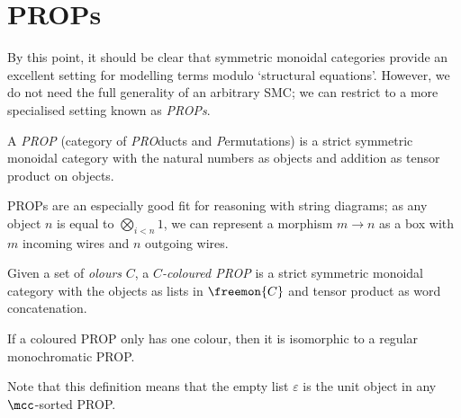 \section{PROPs}

By this point, it should be clear that symmetric monoidal categories provide
an excellent setting for modelling terms modulo `structural equations'.
However, we do not need the full generality of an arbitrary SMC; we can restrict
to a more specialised setting known as \emph{PROPs}.

\begin{definition}
    A \emph{PROP} (category of \emph{PRO}ducts and \emph{P}ermutations) is a
    strict symmetric monoidal category with the natural numbers as objects and
    addition as tensor product on objects.
\end{definition}

PROPs are an especially good fit for reasoning with string diagrams; as any
object \(n\) is equal to \(\bigotimes_{i < n} 1\), we can represent a morphism
\(m \to n\) as a box with \(m\) incoming wires and \(n\) outgoing wires.

\begin{example}

\end{example}

\begin{definition}
    Given a set of \emph{olours} \(C\), a \emph{\(C\)-coloured PROP} is a strict
    symmetric monoidal category with the objects as lists in \(\freemon{C}\) and
    tensor product as word concatenation.
\end{definition}

\begin{remark}
    If a coloured PROP only has one colour, then it is isomorphic to a regular
    monochromatic PROP.
\end{remark}

Note that this definition means that the empty list \(\varepsilon\) is the unit
object in any \(\mcc\)-sorted PROP.

\begin{example}

\end{example}